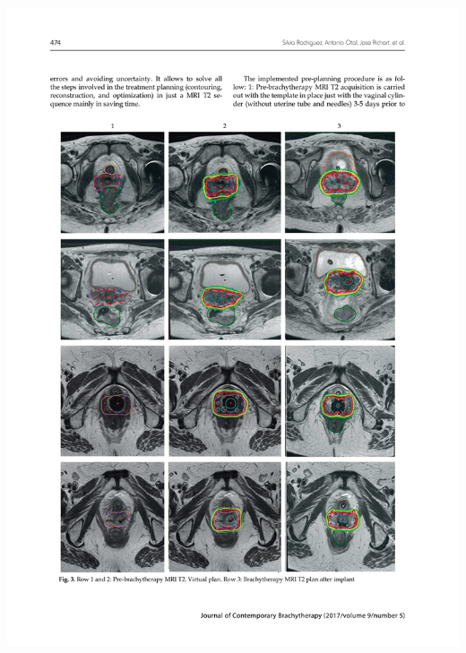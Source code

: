 \documentclass[
  a4paper,
]{scrreprt}
\begin{document}
\includegraphics{articulos/preplan/preplan-3.png}
\end{document}
